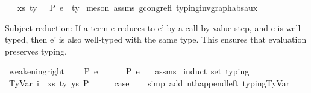 \begin{isabellebody}
\ \ \ {\isachardoublequoteopen}{\isacharparenleft}{\kern0pt}xs{\isacharcomma}{\kern0pt}\ ty{}{\isacharparenright}{\kern0pt}\ {\isacharhash}{\kern0pt}\ {\isasymGamma}\ {\isasymturnstile}{\isacharbraceleft}{\kern0pt}P{\isacharbraceright}{\kern0pt}\ e\ {\isacharcolon}{\kern0pt}\ ty{}{\isachardoublequoteclose}\isanewline
%
\isadelimproof
%
\endisadelimproof
%
\isatagproof
{}\isamarkupfalse%
\ {\isacharparenleft}{\kern0pt}meson\ assms\ gcong{\isachardot}{\kern0pt}refl\ typing{\isacharunderscore}{\kern0pt}inv{\isacharunderscore}{\kern0pt}graph{\isacharunderscore}{\kern0pt}abs{\isacharunderscore}{\kern0pt}aux{\isacharparenright}{\kern0pt}%
\endisatagproof
{\isafoldproof}%
%
\isadelimproof
%
\endisadelimproof
%
\isadelimdocument
%
\endisadelimdocument
%
\isatagdocument
%
\isamarkuptrue%
%
\endisatagdocument
{\isafolddocument}%
%
\isadelimdocument
%
\endisadelimdocument
%
\begin{isamarkuptext}%
Subject reduction:
  If a term e reduces to e' by a call-by-value step,
  and e is well-typed,
  then e' is also well-typed with the same type.
  This ensures that evaluation preserves typing.%
\end{isamarkuptext}\isamarkuptrue%
\isamarkupfalse%
\ weakening{\isacharunderscore}{\kern0pt}right{\isacharcolon}{\kern0pt}\isanewline
\ \ \ {\isachardoublequoteopen}{\isasymGamma}\ {\isasymturnstile}{\isacharbraceleft}{\kern0pt}P{\isacharbraceright}{\kern0pt}\ e\ {\isacharcolon}{\kern0pt}\ {\isasymtau}{\isachardoublequoteclose}\isanewline
\ \ \ {\isachardoublequoteopen}{\isasymGamma}{\isacharat}{\kern0pt}{\isasymGamma}{}\ {\isasymturnstile}{\isacharbraceleft}{\kern0pt}P{\isacharbraceright}{\kern0pt}\ e\ {\isacharcolon}{\kern0pt}\ {\isasymtau}{\isachardoublequoteclose}\isanewline
%
\isadelimproof
%
\endisadelimproof
%
\isatagproof
{}\isamarkupfalse%
\ assms\isanewline
{}\isamarkupfalse%
\ {\isacharparenleft}{\kern0pt}induct\ set{\isacharcolon}{\kern0pt}\ typing{\isacharparenright}{\kern0pt}\isanewline
\ \ \isamarkupfalse%
\ {\isacharparenleft}{\kern0pt}TyVar\ i\ {\isasymGamma}\ xs\ ty\ ys\ P{\isacharparenright}{\kern0pt}\isanewline
\ \ \isamarkupfalse%
\ \isamarkupfalse%
\ {\isacharquery}{\kern0pt}case\isanewline
\ \ \isamarkupfalse%
\ {\isacharparenleft}{\kern0pt}simp\ add{\isacharcolon}{\kern0pt}\ nth{\isacharunderscore}{\kern0pt}append{\isacharunderscore}{\kern0pt}left\ typing{\isachardot}{\kern0pt}TyVar{\isacharparenright}{\kern0pt}\isanewline

\end{isabellebody}
